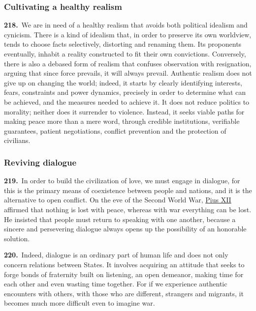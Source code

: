 \documentclass{article}
\begin{document}
\subsubsection{Cultivating a healthy realism}

\textbf{218.}\ We are in need of a healthy realism that avoids both political idealism and cynicism. There is a kind of idealism that, in order to preserve its own worldview, tends to choose facts selectively, distorting and renaming them. Its proponents eventually, inhabit a reality constructed to fit their own convictions. Conversely, there is also a debased form of realism that confuses observation with resignation, arguing that since force prevails, it will always prevail. Authentic realism does not give up on changing the world; indeed, it starts by clearly identifying interests, fears, constraints and power dynamics, precisely in order to determine what can be achieved, and the measures needed to achieve it. It does not reduce politics to morality; neither does it surrender to violence. Instead, it seeks viable paths for making peace more than a mere word, through credible institutions, verifiable guarantees, patient negotiations, conflict prevention and the protection of civilians.

\subsubsection{Reviving dialogue}

\textbf{219.}\ In order to build the civilization of love, we must engage in dialogue, for this is the primary means of coexistence between people and nations, and it is the alternative to open conflict. On the eve of the Second World War, \href{https://www.vatican.va/content/pius-xii/en.html}{Pius XII} affirmed that nothing is lost with peace, whereas with war everything can be lost. He insisted that people must return to speaking with one another, because a sincere and persevering dialogue always opens up the possibility of an honorable solution.\cite{n196}

\textbf{220.}\ Indeed, dialogue is an ordinary part of human life and does not only concern relations between States. It involves acquiring an attitude that seeks to forge bonds of fraternity built on listening, an open demeanor, making time for each other and even wasting time together. For if we experience authentic encounters with others, with those who are different, strangers and migrants, it becomes much more difficult even to imagine war.
\end{document}
